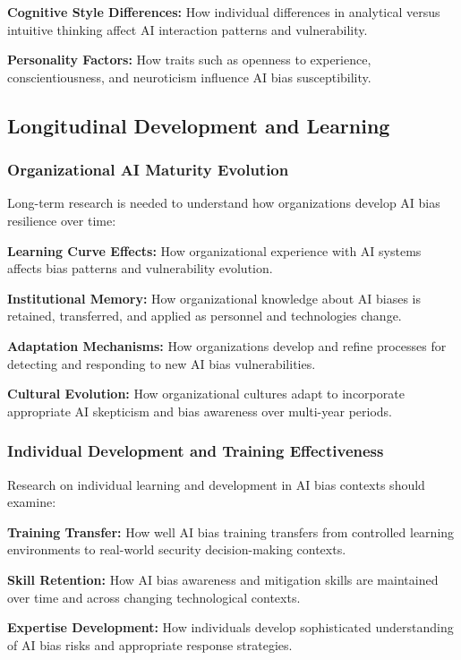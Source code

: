 \documentclass[11pt,a4paper]{article}
\begin{document}
\textbf{Cognitive Style Differences:} How individual differences in analytical versus intuitive thinking affect AI interaction patterns and vulnerability.

\textbf{Personality Factors:} How traits such as openness to experience, conscientiousness, and neuroticism influence AI bias susceptibility.

\subsection{Longitudinal Development and Learning}

\subsubsection{Organizational AI Maturity Evolution}

Long-term research is needed to understand how organizations develop AI bias resilience over time:

\textbf{Learning Curve Effects:} How organizational experience with AI systems affects bias patterns and vulnerability evolution.

\textbf{Institutional Memory:} How organizational knowledge about AI biases is retained, transferred, and applied as personnel and technologies change.

\textbf{Adaptation Mechanisms:} How organizations develop and refine processes for detecting and responding to new AI bias vulnerabilities.

\textbf{Cultural Evolution:} How organizational cultures adapt to incorporate appropriate AI skepticism and bias awareness over multi-year periods.

\subsubsection{Individual Development and Training Effectiveness}

Research on individual learning and development in AI bias contexts should examine:

\textbf{Training Transfer:} How well AI bias training transfers from controlled learning environments to real-world security decision-making contexts.

\textbf{Skill Retention:} How AI bias awareness and mitigation skills are maintained over time and across changing technological contexts.

\textbf{Expertise Development:} How individuals develop sophisticated understanding of AI bias risks and appropriate response strategies.
\end{document}
